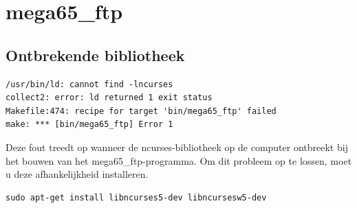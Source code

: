 \section{mega65\_ftp}
    \subsection{Ontbrekende bibliotheek}
    \begin{tcolorbox}[colback=black,coltext=white]
\begin{lstlisting}
/usr/bin/ld: cannot find -lncurses
collect2: error: ld returned 1 exit status
Makefile:474: recipe for target 'bin/mega65_ftp' failed
make: *** [bin/mega65_ftp] Error 1\end{lstlisting}
    \end{tcolorbox}
Deze fout treedt op wanneer de ncurses-bibliotheek op de computer ontbreekt bij het bouwen van het mega65\_ftp-programma.
Om dit probleem op te lossen, moet u deze afhankelijkheid installeren.

    \begin{tcolorbox}[colback=black,coltext=white]
\begin{lstlisting}
sudo apt-get install libncurses5-dev libncursesw5-dev\end{lstlisting}
    \end{tcolorbox}

